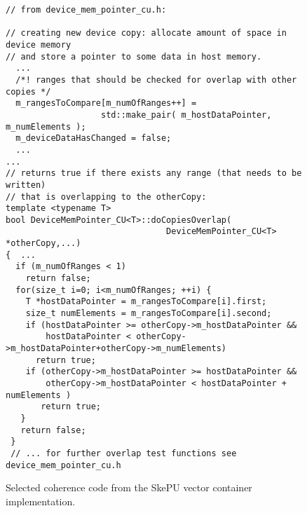 \begin{figure}
%


\begin{small}
\begin{verbatim}
// from device_mem_pointer_cu.h:

// creating new device copy: allocate amount of space in device memory
// and store a pointer to some data in host memory.
  ...
  /*! ranges that should be checked for overlap with other copies */
  m_rangesToCompare[m_numOfRanges++] =
                   std::make_pair( m_hostDataPointer, m_numElements );
  m_deviceDataHasChanged = false;
  ...
...
// returns true if there exists any range (that needs to be written)
// that is overlapping to the otherCopy:
template <typename T>
bool DeviceMemPointer_CU<T>::doCopiesOverlap(
                                DeviceMemPointer_CU<T> *otherCopy,...)
{  ...
  if (m_numOfRanges < 1)
    return false;
  for(size_t i=0; i<m_numOfRanges; ++i) {
    T *hostDataPointer = m_rangesToCompare[i].first;
    size_t numElements = m_rangesToCompare[i].second;
    if (hostDataPointer >= otherCopy->m_hostDataPointer &&
        hostDataPointer < otherCopy->m_hostDataPointer+otherCopy->m_numElements)
      return true;
    if (otherCopy->m_hostDataPointer >= hostDataPointer &&
        otherCopy->m_hostDataPointer < hostDataPointer + numElements )
       return true;
   }
   return false;
 }
 // ... for further overlap test functions see device_mem_pointer_cu.h
\end{verbatim}
\end{small}
%
\caption{\label{fig:skepucoherence3}Selected coherence code from the SkePU vector container implementation.}
\end{figure}

